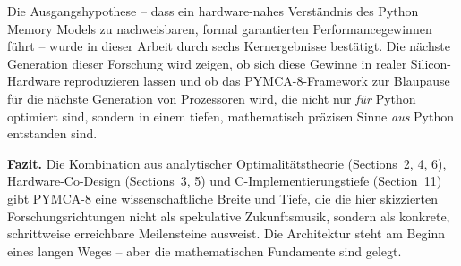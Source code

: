 ﻿\documentclass[a4paper,12pt]{scrreprt}
\theoremstyle{definition}
\begin{document}
	Die Ausgangshypothese -- dass ein hardware-nahes Verständnis des Python
	Memory Models zu nachweisbaren, formal garantierten Performancegewinnen führt
	-- wurde in dieser Arbeit durch sechs Kernergebnisse bestätigt.
	Die nächste Generation dieser Forschung wird zeigen, ob sich diese Gewinne
	in realer Silicon-Hardware reproduzieren lassen und ob das PYMCA-8-Framework
	zur Blaupause für die nächste Generation von Prozessoren wird, die nicht
	nur \emph{für} Python optimiert sind, sondern in einem tiefen, mathematisch
	präzisen Sinne \emph{aus} Python entstanden sind.

	\medskip
	\textbf{Fazit.} Die Kombination aus analytischer Optimalitätstheorie
	(Sections~2, 4, 6), Hardware-Co-Design (Sections~3, 5) und C-Implementierungstiefe
	(Section~11) gibt PYMCA-8 eine wissenschaftliche Breite und Tiefe, die die
	hier skizzierten Forschungsrichtungen nicht als spekulative Zukunftsmusik,
	sondern als konkrete, schrittweise erreichbare Meilensteine ausweist.
	Die Architektur steht am Beginn eines langen Weges -- aber die mathematischen
	Fundamente sind gelegt.
	
\end{document}
